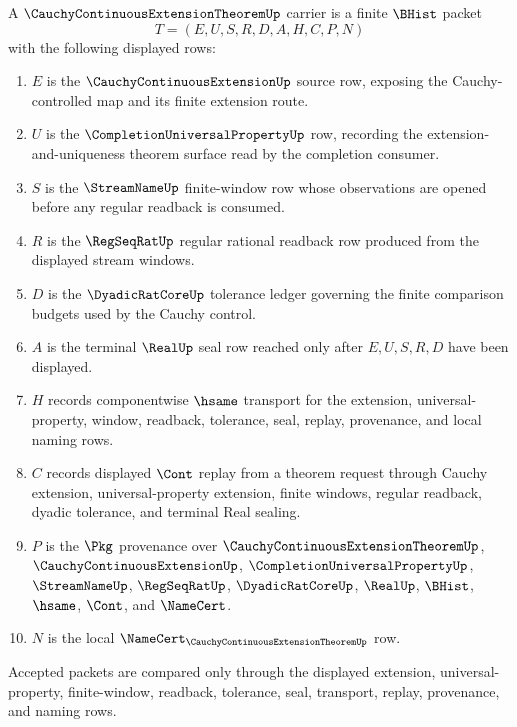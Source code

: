 \begin{definition}
\label{def:cauchy-continuous-extension-theorem-carrier}
A $\CauchyContinuousExtensionTheoremUp$ carrier is a finite $\BHist$ packet
$$
T=(E,U,S,R,D,A,H,C,P,N)
$$
with the following displayed rows:
\begin{enumerate}
\item $E$ is the $\CauchyContinuousExtensionUp$ source row, exposing the Cauchy-controlled map and its finite extension route.
\item $U$ is the $\CompletionUniversalPropertyUp$ row, recording the extension-and-uniqueness theorem surface read by the completion consumer.
\item $S$ is the $\StreamNameUp$ finite-window row whose observations are opened before any regular readback is consumed.
\item $R$ is the $\RegSeqRatUp$ regular rational readback row produced from the displayed stream windows.
\item $D$ is the $\DyadicRatCoreUp$ tolerance ledger governing the finite comparison budgets used by the Cauchy control.
\item $A$ is the terminal $\RealUp$ seal row reached only after $E,U,S,R,D$ have been displayed.
\item $H$ records componentwise $\hsame$ transport for the extension, universal-property, window, readback, tolerance, seal, replay, provenance, and local naming rows.
\item $C$ records displayed $\Cont$ replay from a theorem request through Cauchy extension, universal-property extension, finite windows, regular readback, dyadic tolerance, and terminal Real sealing.
\item $P$ is the $\Pkg$ provenance over $\CauchyContinuousExtensionTheoremUp$, $\CauchyContinuousExtensionUp$, $\CompletionUniversalPropertyUp$, $\StreamNameUp$, $\RegSeqRatUp$, $\DyadicRatCoreUp$, $\RealUp$, $\BHist$, $\hsame$, $\Cont$, and $\NameCert$.
\item $N$ is the local $\NameCert_{\CauchyContinuousExtensionTheoremUp}$ row.
\end{enumerate}
Accepted packets are compared only through the displayed extension, universal-property, finite-window, readback, tolerance, seal, transport, replay, provenance, and naming rows.
\end{definition}

